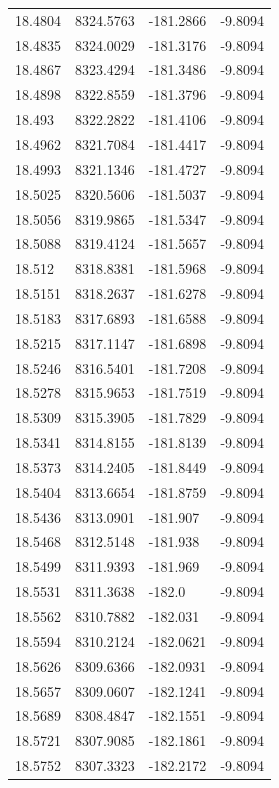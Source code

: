 \begin{table}[H]
\begin{tabular}{llll}
18.4804 & 8324.5763 & -181.2866 & -9.8094 \\
18.4835 & 8324.0029 & -181.3176 & -9.8094 \\
18.4867 & 8323.4294 & -181.3486 & -9.8094 \\
18.4898 & 8322.8559 & -181.3796 & -9.8094 \\
18.493 & 8322.2822 & -181.4106 & -9.8094 \\
18.4962 & 8321.7084 & -181.4417 & -9.8094 \\
18.4993 & 8321.1346 & -181.4727 & -9.8094 \\
18.5025 & 8320.5606 & -181.5037 & -9.8094 \\
18.5056 & 8319.9865 & -181.5347 & -9.8094 \\
18.5088 & 8319.4124 & -181.5657 & -9.8094 \\
18.512 & 8318.8381 & -181.5968 & -9.8094 \\
18.5151 & 8318.2637 & -181.6278 & -9.8094 \\
18.5183 & 8317.6893 & -181.6588 & -9.8094 \\
18.5215 & 8317.1147 & -181.6898 & -9.8094 \\
18.5246 & 8316.5401 & -181.7208 & -9.8094 \\
18.5278 & 8315.9653 & -181.7519 & -9.8094 \\
18.5309 & 8315.3905 & -181.7829 & -9.8094 \\
18.5341 & 8314.8155 & -181.8139 & -9.8094 \\
18.5373 & 8314.2405 & -181.8449 & -9.8094 \\
18.5404 & 8313.6654 & -181.8759 & -9.8094 \\
18.5436 & 8313.0901 & -181.907 & -9.8094 \\
18.5468 & 8312.5148 & -181.938 & -9.8094 \\
18.5499 & 8311.9393 & -181.969 & -9.8094 \\
18.5531 & 8311.3638 & -182.0 & -9.8094 \\
18.5562 & 8310.7882 & -182.031 & -9.8094 \\
18.5594 & 8310.2124 & -182.0621 & -9.8094 \\
18.5626 & 8309.6366 & -182.0931 & -9.8094 \\
18.5657 & 8309.0607 & -182.1241 & -9.8094 \\
18.5689 & 8308.4847 & -182.1551 & -9.8094 \\
18.5721 & 8307.9085 & -182.1861 & -9.8094 \\
18.5752 & 8307.3323 & -182.2172 & -9.8094 \\

\end{tabular}
\end{table}
